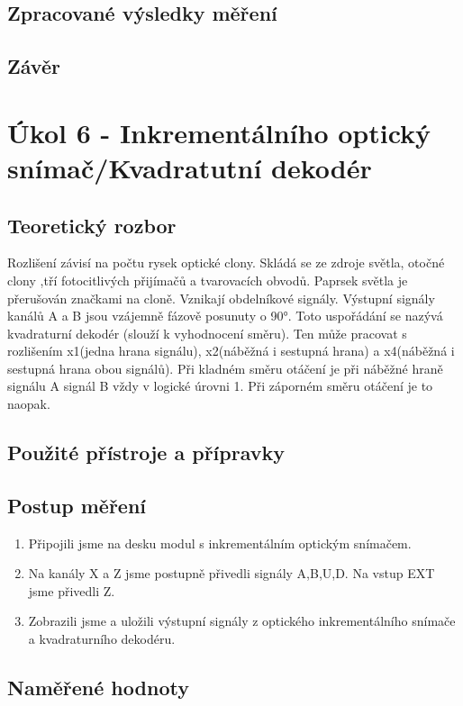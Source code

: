 \documentclass{protokol}
\begin{document}
    \subsection{Zpracované výsledky měření}
    \subsection{Závěr}

\pagebreak


\section{Úkol 6 - Inkrementálního optický snímač/Kvadratutní dekodér}
    \subsection{Teoretický rozbor}
    \noindent Rozlišení závisí na počtu rysek optické clony. Skládá se ze zdroje světla, otočné clony ,tří fotocitlivých přijímačů a tvarovacích obvodů. Paprsek světla je přerušován značkami na cloně. Vznikají obdelníkové signály. Výstupní signály kanálů A a B jsou vzájemně fázově posunuty o 90°. Toto uspořádání se nazývá kvadraturní dekodér (slouží k vyhodnocení směru). Ten může pracovat s rozlišením x1(jedna hrana signálu), x2(náběžná i sestupná hrana) a x4(náběžná i sestupná hrana obou signálů). Při kladném směru otáčení je při náběžné hraně signálu A signál B vždy v logické úrovni 1. Při záporném směru otáčení je to naopak. 

    \subsection{Použité přístroje a přípravky}
    \subsection{Postup měření}
    \begin{enumerate}
        \item Připojili jsme na desku modul s inkrementálním optickým snímačem.
        \item Na kanály X a Z jsme postupně přivedli signály A,B,U,D. Na vstup EXT jsme přivedli Z.
        \item Zobrazili jsme a uložili výstupní signály z optického inkrementálního snímače a kvadraturního dekodéru.
    \end{enumerate}


    \clearpage
    \subsection{Naměřené hodnoty}
\end{document}
